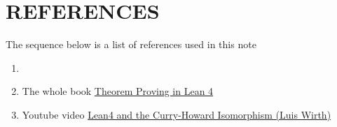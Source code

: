 \chapter{REFERENCES}

The sequence below is a list of references used in this note

\begin{enumerate}
	\item 
	
	\item The whole book \href{https://lean-lang.org/theorem_proving_in_lean4/}{Theorem Proving in Lean 4}
	
	\item Youtube video \href{https://youtu.be/Sy_4z751YWI}{Lean4 and the Curry-Howard Isomorphism (Luis Wirth)}
\end{enumerate}